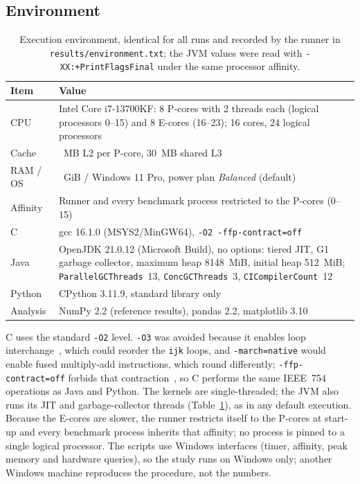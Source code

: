 \documentclass[12pt,a4paper]{article}
\begin{document}
\subsection{Environment}

\begin{table}[htbp]
\centering
\small
\begin{tabular}{l>{\raggedright\arraybackslash}p{11.4cm}}
\toprule
\textbf{Item} & \textbf{Value} \\
\midrule
CPU        & Intel Core i7-13700KF: 8 P-cores with 2 threads each (logical processors
0--15) and 8 E-cores (16--23); 16 cores, 24 logical processors \\
Cache      & 2~MB L2 per P-core, 30~MB shared L3 \\
RAM / OS   & 31.8~GiB / Windows 11 Pro, power plan \textit{Balanced} (default) \\
Affinity   & Runner and every benchmark process restricted to the P-cores (0--15) \\
C          & gcc 16.1.0 (MSYS2/MinGW64), \texttt{-O2 -ffp-contract=off} \\
Java       & OpenJDK 21.0.12 (Microsoft Build), no options: tiered JIT, G1 garbage
collector, maximum heap 8148~MiB, initial heap 512~MiB; \texttt{ParallelGCThreads}~13,
\texttt{ConcGCThreads}~3, \texttt{CICompilerCount}~12 \\
Python     & CPython 3.11.9, standard library only \\
Analysis   & NumPy 2.2 (reference results), pandas 2.2, matplotlib 3.10 \\
\bottomrule
\end{tabular}
\caption{Execution environment, identical for all runs and recorded by the runner in
\texttt{results/environment.txt}; the JVM values were read with
\texttt{-XX:+PrintFlagsFinal} under the same processor affinity.}
\label{tab:env}
\end{table}

C uses the standard \texttt{-O2} level. \texttt{-O3} was avoided because it enables loop
interchange~\cite{gccopt}, which could reorder the \texttt{ijk} loops, and
\texttt{-march=native} would enable fused multiply-add instructions, which round
differently; \texttt{-ffp-contract=off} forbids that contraction~\cite{gccopt}, so C
performs the same IEEE~754 operations as Java and Python. The kernels are
single-threaded; the JVM also runs its JIT and garbage-collector threads
(Table~\ref{tab:env}), as in any default execution. Because the E-cores are slower, the
runner restricts itself to the P-cores at start-up and every benchmark process inherits
that affinity; no process is pinned to a single logical processor. The scripts use
Windows interfaces (timer, affinity, peak memory and hardware queries), so the study runs
on Windows only; another Windows machine reproduces the procedure, not the numbers.
\end{document}
